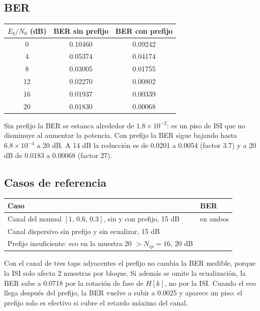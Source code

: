 \documentclass[11pt,a4paper]{article}
\begin{document}
\subsection{BER}

\begin{tabular}{@{}ccc@{}}
  \toprule
  $E_b/N_0$ (dB) & BER sin prefijo & BER con prefijo \\
  \midrule
  0  & 0.10460 & 0.09242 \\
  4  & 0.05374 & 0.04174 \\
  8  & 0.03005 & 0.01755 \\
  12 & 0.02270 & 0.00802 \\
  16 & 0.01937 & 0.00339 \\
  20 & 0.01830 & 0.00068 \\
  \bottomrule
\end{tabular}


Sin prefijo la BER se estanca alrededor de $1.8\times10^{-2}$: es un piso de ISI que no
disminuye al aumentar la potencia. Con prefijo la BER sigue bajando hasta
$6.8\times10^{-4}$ a 20 dB. A 14 dB la reducción es de 0.0201 a 0.0054 (factor 3.7) y a
20 dB de 0.0183 a 0.00068 (factor 27).

\subsection{Casos de referencia}

\begin{tabularx}{\linewidth}{@{}*{2}{>{\raggedright\arraybackslash}X}@{}}
  \toprule
  Caso & BER \\
  \midrule
  Canal del manual $[1,\,0.6,\,0.3]$, sin y con prefijo, 15 dB & 0 en ambos \\
  Canal dispersivo sin prefijo y sin ecualizar, 15 dB & 0.0718 \\
  Prefijo insuficiente: eco en la muestra 20 $>N_{cp}=16$, 20 dB & 0.0025 \\
  \bottomrule
\end{tabularx}

Con el canal de tres taps adyacentes el prefijo no cambia la BER medible, porque la ISI
solo afecta 2 muestras por bloque. Si además se omite la ecualización, la BER sube a
0.0718 por la rotación de fase de $H[k]$, no por la ISI. Cuando el eco llega después del
prefijo, la BER vuelve a subir a 0.0025 y aparece un piso: el prefijo solo es efectivo si
cubre el retardo máximo del canal.
\end{document}

